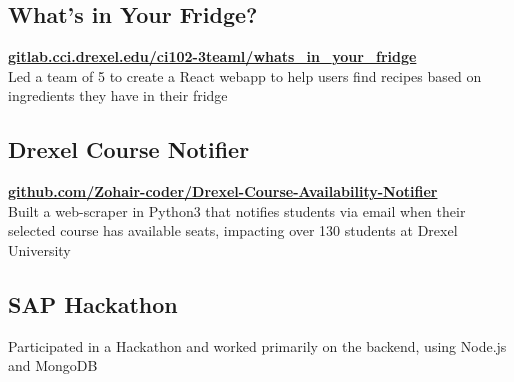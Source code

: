 \documentclass[]{deedy-resume-openfont}
\begin{document}
\begin{minipage}[t]{0.33\textwidth}
        \subsection{What's in Your Fridge?}
        \textbf{\href{https://gitlab.cci.drexel.edu/ci102-3teaml/whats_in_your_fridge}{gitlab.cci.drexel.edu/ci102-3teaml/whats\_in\_your\_fridge}} \\
        \vspace{\topsep}
        Led a team of 5 to create a React webapp to help users find recipes based on ingredients they have in their fridge
        
        \vspace{\topsep}
        
        \subsection{Drexel Course Notifier}
        \textbf{\href{https://github.com/Zohair-coder/Drexel-Course-Availability-Notifier}{github.com/Zohair-coder/Drexel-Course-Availability-Notifier}} \\
        \vspace{\topsep}
        Built a web-scraper in Python3 that notifies students via email when their selected course has available seats, impacting over 130 students at Drexel University
        
        \vspace{\topsep}
        
        \subsection{SAP Hackathon}
        \vspace{\topsep}
        Participated in a Hackathon and worked primarily on the backend, using Node.js and MongoDB
        
        

\end{minipage}
\end{document}
